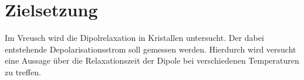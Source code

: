 \section{Zielsetzung}
\label{sec:Zielsetzung}
Im Vreusch wird die Dipolrelaxation in Kristallen untersucht.
Der dabei entstehende Depolarisationsstrom soll gemessen werden.
Hierdurch wird versucht eine Aussage über die Relaxationszeit der Dipole bei verschiedenen Temperaturen zu treffen.
